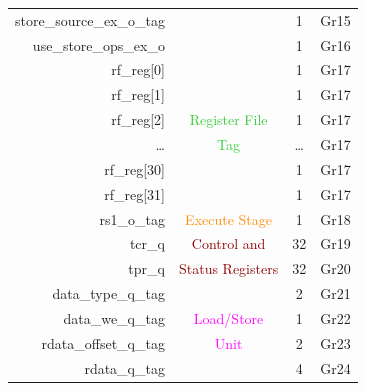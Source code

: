 \begin{table}[t]
\begin{tabular}{@{}rccc@{}}
        store\_source\_ex\_o\_tag       &                                       & 1      & Gr15                        \\
        use\_store\_ops\_ex\_o          &                                       & 1      & Gr16                        \\\hdashline
        rf\_reg[0]                      &                                       & 1      & Gr17                        \\
        rf\_reg[1]                      &                                       & 1      & Gr17                        \\
        rf\_reg[2]                      & \textcolor{LimeGreen}{Register File}  & 1      & Gr17                        \\
        \ldots                          & \textcolor{LimeGreen}{Tag}            & \ldots & Gr17                        \\
        rf\_reg[30]                     &                                       & 1      & Gr17                        \\
        rf\_reg[31]                     &                                       & 1      & Gr17                        \\\hdashline
        rs1\_o\_tag                     & \textcolor{DarkOrange}{Execute Stage} & 1      & Gr18                        \\\hdashline
        tcr\_q                          & \textcolor{DarkRed}{Control and}      & 32     & Gr19                        \\
        tpr\_q                          & \textcolor{DarkRed}{Status Registers} & 32     & Gr20                        \\\hdashline
        data\_type\_q\_tag              &                                       & 2      & Gr21                        \\
        data\_we\_q\_tag                & \textcolor{magenta}{Load/Store}       & 1      & Gr22                        \\
        rdata\_offset\_q\_tag           & \textcolor{magenta}{Unit}             & 2      & Gr23                        \\
        rdata\_q\_tag                   &                                       & 4      & Gr24                        \\
        \bottomrule
    \end{tabular}
\end{table}

